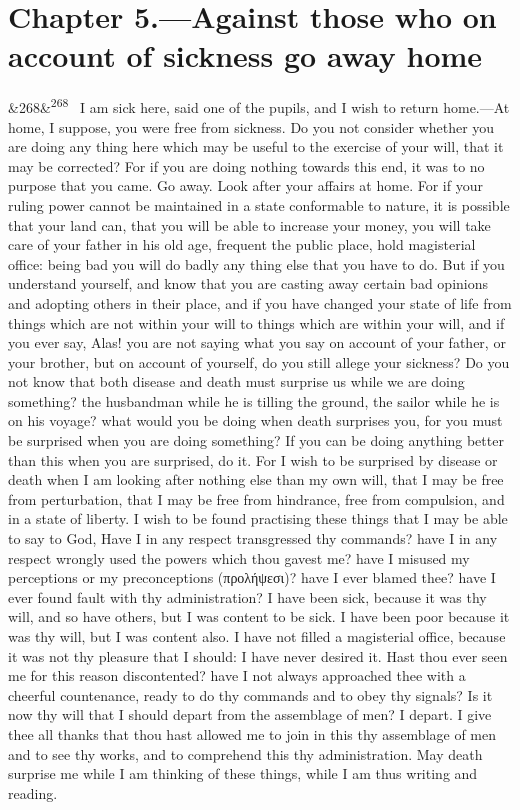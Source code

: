 \documentclass[12pt]{article}
\newcommand{\para}[1][]{\par\noindent\ifx&#1&\else\textsuperscript{\footnotesize #1}~\fi}
\begin{document}
\section*{Chapter 5.---Against those who on account of sickness go away home}

\para[268] I am sick here, said one of the pupils, and I wish to return home.—At home, I suppose, you were free from sickness. Do you not consider whether you are doing any thing here which may be useful to the exercise of your will, that it may be corrected? For if you are doing nothing towards this end, it was to no purpose that you came. Go away. Look after your affairs at home. For if your ruling power cannot be maintained in a state conformable to nature, it is possible that your land can, that you will be able to increase your money, you will take care of your father in his old age, frequent the public place, hold magisterial office: being bad you will do badly any thing else that you have to do. But if you understand yourself, and know that you are casting away certain bad opinions and adopting others in their place, and if you have changed your state of life from things which are not within your will to things which are within your will, and if you ever say, Alas! you are not saying what you say on account of your father, or your brother, but on account of yourself, do you still allege your sickness? Do you not know that both disease and death must surprise us while we are doing something? the husbandman while he is tilling the ground, the sailor while he is on his voyage? what would you be doing when death surprises you, for you must be surprised when you are doing something? If you can be doing anything better than this when you are surprised, do it. For I wish to be surprised by disease or death when I am looking after nothing else than my own will, that I may be free from perturbation, that I may be free from hindrance, free from compulsion, and in a state of liberty. I wish to be found practising these things that I may be able to say to God, Have I in any respect transgressed thy commands? have I in any respect wrongly used the powers which thou gavest me? have I misused my perceptions or my preconceptions (προλήψεσι)? have I ever blamed thee? have I ever found fault with thy administration? I have been sick, because it was thy will, and so have others, but I was content to be sick. I have been poor because it was thy will, but I was content also. I have not filled a magisterial office, because it was not thy pleasure that I should: I have never desired it. Hast thou ever seen me for this reason discontented? have I not always approached thee with a cheerful countenance, ready to do thy commands and to obey thy signals? Is it now thy will that I should depart from the assemblage of men? I depart. I give thee all thanks that thou hast allowed me to join in this thy assemblage of men and to see thy works, and to comprehend this thy administration. May death surprise me while I am thinking of these things, while I am thus writing and reading.
\end{document}
